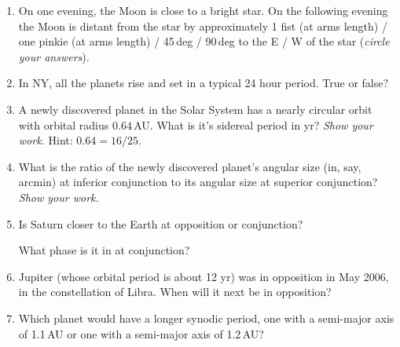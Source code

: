 \documentclass[12pt]{article}
\begin{document}
\begin{enumerate}
\item 
On one evening, the Moon is close to a bright star. On the following
evening the Moon is distant from the star by approximately
1 fist (at arms length) / one pinkie (at arms length) / 45\,deg / 90\,deg
to the E / W of the star (\emph{circle your answers}).

\item 
In NY, all the planets rise and set in a typical 24 hour period.  True
or false?

\vspace{0.5in}

\item 
A newly discovered planet in the Solar System has a nearly circular
orbit with orbital radius $0.64$\,AU.  What is it's sidereal period
in yr?  \emph{Show your work.}  Hint: $0.64=16/25$.

\vspace{1.5in}

\item
What is the ratio of the newly discovered planet's angular size (in,
say, arcmin) at inferior conjunction to its angular size at superior
conjunction?  \emph{Show your work.}

\vspace{1.5in}

\item 
Is Saturn closer to the Earth at opposition or conjunction?

\vspace{0.5in}

What phase is it in at conjunction?

\vspace{0.5in}

\item
Jupiter (whose orbital period is about 12 yr) was in opposition in May
2006, in the constellation of Libra.  When will it next be in
opposition?

\vspace{0.5in}

\item
Which planet would have a longer synodic period, one with a semi-major
axis of 1.1\,AU or one with a semi-major axis of 1.2\,AU?

\vspace{0.5in}

\end{enumerate}
\end{document}

